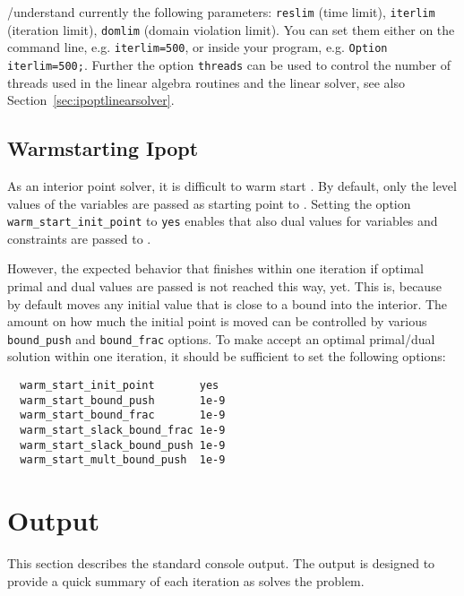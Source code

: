 
\GAMS/\IPOPT understand currently the following \GAMS parameters: \texttt{reslim} (time limit), \texttt{iterlim} (iteration limit), \texttt{domlim} (domain violation limit).
You can set them either on the command line, e.g. \verb+iterlim=500+, or inside your \GAMS program, e.g. \verb+Option iterlim=500;+.
Further the option \texttt{threads} can be used to control the number of threads used in the linear algebra routines and the linear solver, see also Section~\ref{sec:ipoptlinearsolver}.

\subsection{Warmstarting Ipopt}

As an interior point solver, it is difficult to warm start \IPOPT.
By default, only the level values of the variables are passed as starting point to \IPOPT.
Setting the \IPOPT option \texttt{warm\_start\_init\_point} to \texttt{yes} enables that also dual values for variables and constraints are passed to \IPOPT.

However, the expected behavior that \IPOPT finishes within one iteration if optimal primal and dual values are passed is not reached this way, yet. This is, because \IPOPT by default moves any initial value that is close to a bound into the interior. The amount on how much the initial point is moved can be controlled by various \texttt{bound\_push} and \texttt{bound\_frac} options.
To make \IPOPT accept an optimal primal/dual solution within one iteration, it should be sufficient to set the following options:
\begin{verbatim}
  warm_start_init_point       yes
  warm_start_bound_push       1e-9
  warm_start_bound_frac       1e-9
  warm_start_slack_bound_frac 1e-9
  warm_start_slack_bound_push 1e-9
  warm_start_mult_bound_push  1e-9
\end{verbatim}

\section{Output}

This section describes the standard \IPOPT console output.
The output is designed to provide a quick summary of each iteration as \IPOPT solves the problem.

